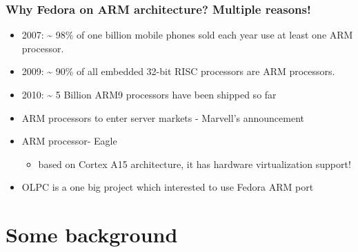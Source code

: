 \documentclass[11pt]{beamer}
\begin{document}
\begin{frame}[fragile]\frametitle{Why Fedora on ARM architecture? Multiple reasons!}
\label{sec-2.2}

\begin{itemize}

\item 2007: \~{} 98\% of one billion mobile phones sold each year use at least one ARM processor.\\
\label{sec-2.2.1}


\item 2009: \~{} 90\% of all embedded 32-bit RISC processors are ARM processors.\\
\label{sec-2.2.2}


\item 2010: \~{} 5 Billion ARM9 processors have been shipped so far\\
\label{sec-2.2.3}


\item ARM processors to enter server markets - Marvell's announcement\\
\label{sec-2.2.4}


\item ARM processor- Eagle\\
\label{sec-2.2.5}

\begin{itemize}

\item based on Cortex A15 architecture, it has hardware virtualization support!\\
\label{sec-2.2.5.1}

\end{itemize} %

\item OLPC is a one big project which interested to use Fedora ARM port\\
\label{sec-2.2.6}


\end{itemize} %
\end{frame}
\section{Some background}
\label{sec-3}
\end{document}
